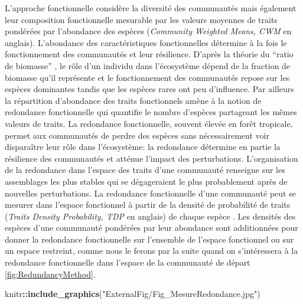 \documentclass[
  11pt,
  french,
  A4paper,
  extrafontsizes,onecolumn,openright
  ]{memoir}
\newenvironment{Shaded}{\begin{snugshade}}{\end{snugshade}}
\newcommand{\KeywordTok}[1]{\textcolor[rgb]{0.13,0.29,0.53}{\textbf{#1}}}
\newcommand{\StringTok}[1]{\textcolor[rgb]{0.31,0.60,0.02}{#1}}
\newcommand{\OperatorTok}[1]{\textcolor[rgb]{0.81,0.36,0.00}{\textbf{#1}}}
\newcommand{\NormalTok}[1]{#1}
\begin{document}
L'approche fonctionnelle considère la diversité des communautés mais
également leur composition fonctionnelle mesurable par les valeurs
moyennes de traits pondérées par l'abondance des espèces
(\emph{Community Weighted Means, CWM} en anglais). L'abondance des
caractéristiques fonctionnelles détermine à la fois le fonctionnement
des communautés et leur résilience. D'après la théorie du ``ratio de
biomasse'' \autocite{Grime1998}, le rôle d'un individu dans l'écosystème
dépend de la fraction de biomasse qu'il représente et le fonctionnement
des communautés repose sur les espèces dominantes tandis que les espèces
rares ont peu d'influence. Par ailleurs la répartition d'abondance des
traits fonctionnels amène à la notion de redondance fonctionnelle qui
quantifie le nombre d'espèces partageant les mêmes valeurs de traits. La
redondance fonctionnelle, souvent élevée en forêt tropicale, permet aux
communautés de perdre des espèces sans nécessairement voir disparaître
leur rôle dans l'écosystème: la redondance détermine en partie la
résilience des communautés et atténue l'impact des perturbations.
L'organisation de la redondance dans l'espace des traits d'une
communauté renseigne sur les assemblages les plus stables qui se
dégageraient le plus probablement après de nouvelles perturbations. La
redondance fonctionnelle d'une communauté peut se mesurer dans l'espace
fonctionnel à partir de la densité de probabilité de traits
(\emph{Traits Density Probability, TDP} en anglais) de chaque espèce
\autocite{2016Carmona}. Les densités des espèces d'une communauté
pondérées par leur abondance sont additionnées pour donner la redondance
fonctionnelle sur l'ensemble de l'espace fonctionnel ou sur un espace
restreint, comme nous le ferons par la suite quand on s'intéressera à la
redondance fonctionnelle dans l'espace de la communauté de départ
\ref{fig:RedundancyMethod}.

\begin{Shaded}
\begin{Highlighting}[]
\NormalTok{knitr}\OperatorTok{::}\KeywordTok{include_graphics}\NormalTok{(}\StringTok{"ExternalFig/Fig_MesureRedondance.jpg"}\NormalTok{)}
\end{Highlighting}
\end{Shaded}
\end{document}
